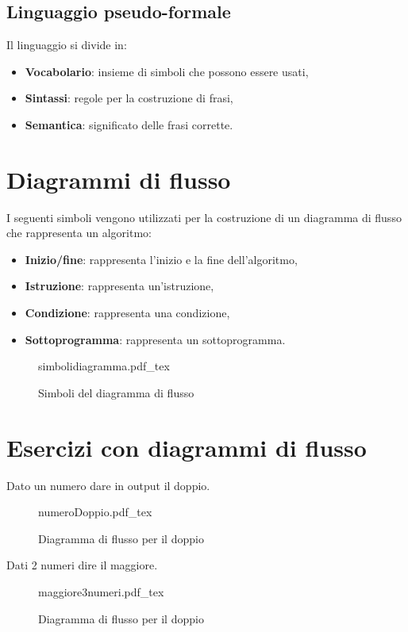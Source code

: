 \documentclass[a4paper]{article}
\theoremstyle{break}
\theoremstyle{break}
\theoremstyle{break}
\theoremstyle{break}
\newcommand{\incfig}[2][1]{%
	\def\svgwidth{#1\columnwidth}
	{#2.pdf_tex}
}
\begin{document}
\subsection{Linguaggio pseudo-formale}
Il linguaggio si divide in:
\begin{itemize}
	\item \textbf{Vocabolario}: insieme di simboli che possono essere usati,
	\item \textbf{Sintassi}: regole per la costruzione di frasi,
	\item \textbf{Semantica}: significato delle frasi corrette.
\end{itemize}

\section{Diagrammi di flusso}
I seguenti simboli vengono utilizzati per la costruzione di un diagramma
di flusso che rappresenta un algoritmo:
\begin{itemize}
	\item \textbf{Inizio/fine}: rappresenta l'inizio e la fine dell'algoritmo,
	\item \textbf{Istruzione}: rappresenta un'istruzione,
	\item \textbf{Condizione}: rappresenta una condizione,
	\item \textbf{Sottoprogramma}: rappresenta un sottoprogramma.
\end{itemize}

\begin{figure}[H]
	\centering
	\incfig[0.3]{simbolidiagramma}
	\caption{Simboli del diagramma di flusso}
	\label{fig:simbolidiagramma}
\end{figure}

\section{Esercizi con diagrammi di flusso}
Dato un numero dare in output il doppio.
\begin{figure}[H]
	\centering
	\incfig[0.3]{numeroDoppio}
	\caption{Diagramma di flusso per il doppio}
	\label{fig:doppio}
\end{figure}

Dati 2 numeri dire il maggiore.
\begin{figure}[H]
	\centering
	\incfig[1]{maggiore3numeri}
	\caption{Diagramma di flusso per il doppio}
	\label{fig:maggiore3numeri}
\end{figure}
\end{document}
